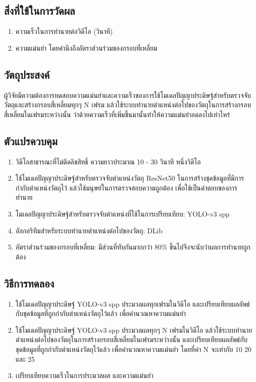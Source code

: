 \subsection*{สิ่งที่ใช้ในการวัดผล}
	\begin{enumerate}
		\setlength\itemsep{-0.25em}
		\item ความเร็วในการทำนายต่อวิดีโอ (วินาที)
		\item ความแม่นยำ โดยคำนึงถึงอัตราส่วนร่วมของกรอบที่เหลี่ยม
	\end{enumerate}
\subsection*{วัตถุประสงค์}
ผู้วิจัยมีความต้องการทดสอบความแม่นยำและความเร็วของการใช้โมเดลปัญญาประดิษฐ์สำหรับตรวจจับวัตถุและสร้างกรอบสี่เหลี่ยมทุกๆ N เฟรม 
แล้วใช้ระบบทำนายตำแหน่งต่อไปของวัตถุในการสร้างกรอบสี่เหลี่ยมในเฟรมระหว่างนั้น ว่าด้วยความเร็วที่เพิ่มขึ้นมานั้นทำให้ความแม่นยำลดลงไปเท่าไหร่
\subsection*{ตัวแปรควบคุม}
	\begin{enumerate}
		\setlength\itemsep{-0.25em}
		\item วิดีโอสาธารณะที่ไม่ติดลิขสิทธิ์ ความยาวประมาณ 10 - 30 วินาที หนึ่งวิดีโอ
		\item ใช้โมเดลปัญญาประดิษฐ์สำหรับตรวจจับตำแหน่งวัตถุ ResNet50 ในการสร้างชุดข้อมูลที่มีการกำกับตำแหน่งวัตถุไว้ แล้วใช้มนุษย์ในการตรวจสอบความถูกต้อง
		เพื่อใช้เป็นคำตอบของการทำนาย
		\item โมเดลปัญญาประดิษฐ์สำหรับตรวจจับตำแหน่งที่ใช้ในการเปรียบเทียบ: YOLO-v3 spp
		\item อัลกอริทึมสำหรับระบบทำนายตำแหน่งต่อไปของวัตถุ: DLib
		\item อัตราส่วนร่วมของกรอบที่เหลี่ยม: มีส่วนที่ทับกันมากกว่า 80\% ขึ้นไปจึงจะนับว่าผลการทำนายถูกต้อง
	\end{enumerate}
\subsection*{วิธีการทดลอง}
	\begin{enumerate}
		\setlength\itemsep{-0.25em}
		\item ใช้โมเดลปัญญาประดิษฐ์ YOLO-v3 spp ประมวลผลทุกเฟรมในวิดีโอ และเปรียบเทียบผลลัพธ์กับชุดข้อมูลที่ถูกกำกับตำแหน่งวัตถุไว้แล้ว เพื่อคำนวณหาความแม่นยำ
		\item ใช้โมเดลปัญญาประดิษฐ์ YOLO-v3 spp ประมวลผลทุกๆ N เฟรมในวิดีโอ แล้วใช้ระบบทำนายตำแหน่งต่อไปของวัตถุในการสร้างกรอบสี่เหลี่ยมในเฟรมระหว่างนั้น 
		และเปรียบเทียบผลลัพธ์กับชุดข้อมูลที่ถูกกำกับตำแหน่งวัตถุไว้แล้ว เพื่อคำนวณหาความแม่นยำ โดยที่ค่า N จะเท่ากับ 10 20 และ 25
		\item เปรียบเทียบความเร็วในการประมวลผล และความแม่นยำ
\end{enumerate}